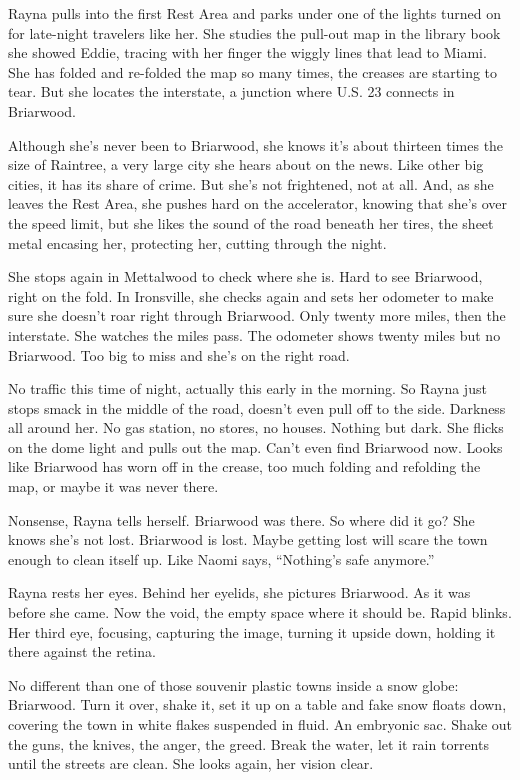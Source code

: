 \documentclass[
]{article}
\begin{document}
Rayna pulls into the first Rest Area and parks under one of the lights
turned on for late-night travelers like her. She studies the pull-out
map in the library book she showed Eddie, tracing with her finger the
wiggly lines that lead to Miami. She has folded and re-folded the map so
many times, the creases are starting to tear. But she locates the
interstate, a junction where U.S. 23 connects in Briarwood.

Although she's never been to Briarwood, she knows it's about thirteen
times the size of Raintree, a very large city she hears about on the
news. Like other big cities, it has its share of crime. But she's not
frightened, not at all. And, as she leaves the Rest Area, she pushes
hard on the accelerator, knowing that she's over the speed limit, but
she likes the sound of the road beneath her tires, the sheet metal
encasing her, protecting her, cutting through the night.

She stops again in Mettalwood to check where she is. Hard to see
Briarwood, right on the fold. In Ironsville, she checks again and sets
her odometer to make sure she doesn't roar right through Briarwood. Only
twenty more miles, then the interstate. She watches the miles pass. The
odometer shows twenty miles but no Briarwood. Too big to miss and she's
on the right road.

No traffic this time of night, actually this early in the morning. So
Rayna just stops smack in the middle of the road, doesn't even pull off
to the side. Darkness all around her. No gas station, no stores, no
houses. Nothing but dark. She flicks on the dome light and pulls out the
map. Can't even find Briarwood now. Looks like Briarwood has worn off in
the crease, too much folding and refolding the map, or maybe it was
never there.

Nonsense, Rayna tells herself. Briarwood was there. So where did it go?
She knows she's not lost. Briarwood is lost. Maybe getting lost will
scare the town enough to clean itself up. Like Naomi says, ``Nothing's
safe anymore.''

Rayna rests her eyes. Behind her eyelids, she pictures Briarwood. As it
was before she came. Now the void, the empty space where it should be.
Rapid blinks. Her third eye, focusing, capturing the image, turning it
upside down, holding it there against the retina.

No different than one of those souvenir plastic towns inside a snow
globe: Briarwood. Turn it over, shake it, set it up on a table and fake
snow floats down, covering the town in white flakes suspended in fluid.
An embryonic sac. Shake out the guns, the knives, the anger, the greed.
Break the water, let it rain torrents until the streets are clean. She
looks again, her vision clear.
\end{document}
